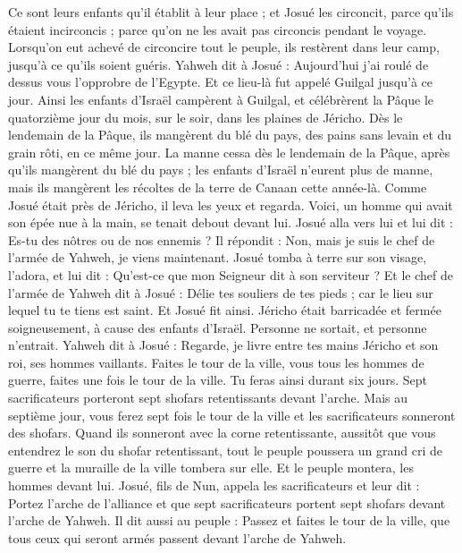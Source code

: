 \begin{multicols}{2}
Ce sont leurs enfants qu’il établit à leur place ; et Josué les circoncit, parce qu’ils étaient incirconcis ; parce qu’on ne les avait pas circoncis pendant le voyage.
Lorsqu’on eut achevé de circoncire tout le peuple, ils restèrent dans leur camp, jusqu’à ce qu’ils soient guéris.
Yahweh dit à Josué : Aujourd’hui j’ai roulé de dessus vous l’opprobre de l’Egypte. Et ce lieu-là fut appelé Guilgal jusqu’à ce jour.
Ainsi les enfants d’Israël campèrent à Guilgal, et célébrèrent la Pâque le quatorzième jour du mois, sur le soir, dans les plaines de Jéricho.
Dès le lendemain de la Pâque, ils mangèrent du blé du pays, des pains sans levain et du grain rôti, en ce même jour.
La manne cessa dès le lendemain de la Pâque, après qu’ils mangèrent du blé du pays ; les enfants d’Israël n’eurent plus de manne, mais ils mangèrent les récoltes de la terre de Canaan cette année-là.
Comme Josué était près de Jéricho, il leva les yeux et regarda. Voici, un homme qui avait son épée nue à la main, se tenait debout devant lui. Josué alla vers lui et lui dit : Es-tu des nôtres ou de nos ennemis ?
Il répondit : Non, mais je suis le chef de l’armée de Yahweh, je viens maintenant. Josué tomba à terre sur son visage, l’adora, et lui dit : Qu’est-ce que mon Seigneur dit à son serviteur ?
Et le chef de l’armée de Yahweh dit à Josué : Délie tes souliers de tes pieds ; car le lieu sur lequel tu te tiens est saint. Et Josué fit ainsi.
\VerseOne{}Jéricho était barricadée et fermée soigneusement, à cause des enfants d’Israël. Personne ne sortait, et personne n’entrait.
Yahweh dit à Josué : Regarde, je livre entre tes mains Jéricho et son roi, ses hommes vaillants.
Faites le tour de la ville, vous tous les hommes de guerre, faites une fois le tour de la ville. Tu feras ainsi durant six jours.
Sept sacrificateurs porteront sept shofars retentissants devant l’arche. Mais au septième jour, vous ferez sept fois le tour de la ville et les sacrificateurs sonneront des shofars.
Quand ils sonneront avec la corne retentissante, aussitôt que vous entendrez le son du shofar retentissant, tout le peuple poussera un grand cri de guerre et la muraille de la ville tombera sur elle. Et le peuple montera, les hommes devant lui.
Josué, fils de Nun, appela les sacrificateurs et leur dit : Portez l’arche de l’alliance et que sept sacrificateurs portent sept shofars devant l’arche de Yahweh.
Il dit aussi au peuple : Passez et faites le tour de la ville, que tous ceux qui seront armés passent devant l’arche de Yahweh.

\end{multicols}
